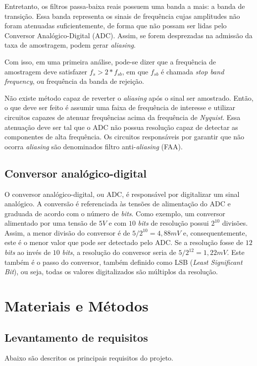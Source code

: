 \documentclass[
	12pt,				%
	openright,			%
	twoside,			%
	a4paper,			%
	english,			%
	french,				%
	spanish,			%
	brazil,				%
	]{abntex2}
\begin{document}
		Entretanto, os filtros passa-baixa reais possuem uma banda a
		mais: a banda de transição. Essa banda representa os sinais de
		frequência cujas amplitudes não foram atenuadas suficientemente,
		de forma que não possam ser lidas pelo Conversor Analógico-Digital
		(ADC). Assim, se forem desprezadas na admissão da taxa de amostragem,
		podem gerar \textit{aliasing}.

		Com isso, em uma primeira análise, pode-se dizer que a frequência de
		amostragem deve satisfazer $f_s>2*f_{sb}$, em que $f_{sb}$ é chamada
		\textit{stop band frequency}, ou frequência da banda de rejeição.

		Não existe método capaz de reverter o \textit{aliasing} após o
		sinal ser amostrado. Então, o que deve ser feito é assumir uma
		faixa de frequência de interesse e utilizar circuitos capazes de
		atenuar frequências acima da frequência de \textit{Nyquist}.
		Essa atenuação deve ser tal que o ADC não possua resolução capaz
		de detectar as componentes de alta frequência. Os circuitos
		responsáveis por garantir que não ocorra \textit{aliasing} são
		denominados filtro anti-\textit{aliasing} (FAA).

	\section{Conversor analógico-digital}
		O conversor analógico-digital, ou ADC, é responsável por digitalizar
		um sinal analógico. A conversão é referenciada às tensões de alimentação
		do ADC e graduada de acordo com o número de \textit{bits}. Como exemplo,
		um conversor alimentado por uma tensão de $5V$ e com $10$ \textit{bits} de
		resolução possui $2^{10}$ divisões. Assim, a menor divisão do conversor é
		de $5/2^{10} = 4,88mV$ e, consequentemente, este é o menor valor que pode
		ser detectado pelo ADC. Se a resolução fosse de $12$ \textit{bits} ao invés
		de $10$ \textit{bits}, a resolução do conversor seria de $5/2^{12}=1,22mV$.
		Este também é o passo do conversor, também definido como LSB
		(\textit{Least Significant Bit}), ou seja, todas os valores digitalizados
		são múltiplos da resolução.

\chapter{Materiais e Métodos}
	\section{Levantamento de requisitos}
		Abaixo são descritos os principais requisitos do projeto.
\end{document}
